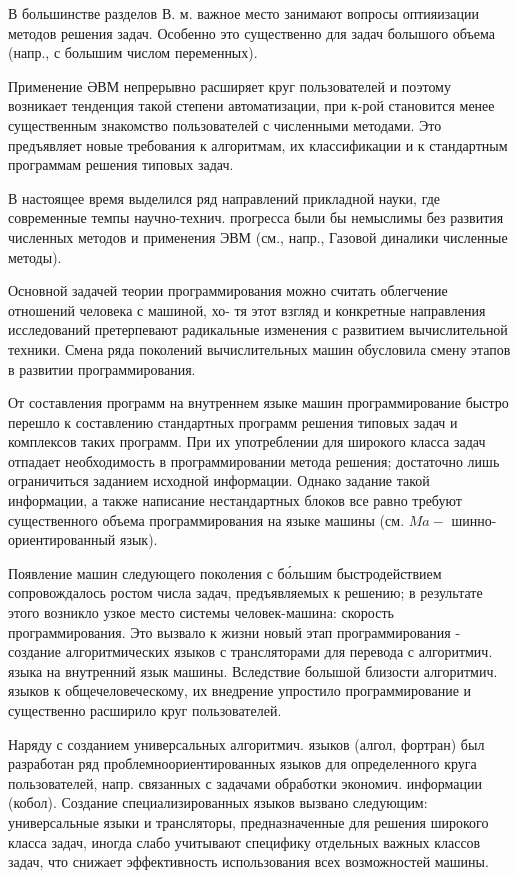 \documentclass[10pt]{article}
\begin{document}
В большинстве разделов В. м. важное место занимают вопросы оптияизации методов решения задач. Особенно это существенно для задач болышого объема (напр., с болышим числом переменных).



Применение ӘВМ непрерывно расширяет круг пользователей и поэтому возникает тенденция такой степени автоматизации, при к-рой становится менее существенным знакомство пользователей с численными методами. Это предъявляет новые требования к алгоритмам, их классификации и к стандартным программам решения типовых задач.



В настоящее время выделился ряд направлений прикладной науки, где современные темпы научно-технич. прогресса были бы немыслимы без развития численных методов и применения ЭВМ (см., напр., Газовой диналики численные методы).



Основной задачей теории программирования можно считать облегчение отношений человека с машиной, хо- тя этот взгляд и конкретные направления исследований претерпевают радикальные изменения с развитием вычислительной техники. Смена ряда поколений вычислительных машин обусловила смену этапов в развитии программирования.



От составления программ на внутреннем языке машин программирование быстро перешло к составлению стандартных программ решения типовых задач и комплексов таких программ. При их употреблении для широкого класса задач отпадает необходимость в программировании метода решения; достаточно лишь ограничиться заданием исходной информации. Однако задание такой информации, а также написание нестандартных блоков все равно требуют существенного объема программирования на языке машины (см. $M a-$ шинно-ориентированный язык).



Появление машин следующего поколения с бо́льшим быстродействием сопровождалось ростом числа задач, предъявляемых к решению; в результате этого возникло узкое место системы человек-машина: скорость программирования. Это вызвало к жизни новый этап программирования - создание алгоритмических языков с трансляторами для перевода с алгоритмич. языка на внутренний язык машины. Вследствие болышой близости алгоритмич. языков к общечеловеческому, их внедрение упростило программирование и существенно расширило круг пользователей.



Наряду с созданием универсальных алгоритмич. языков (алгол, фортран) был разработан ряд проблемноориентированных языков для определенного круга пользователей, напр. связанных с задачами обработки экономич. информации (кобол). Создание специализированных языков вызвано следующим: универсальные языки и трансляторы, предназначенные для решения широкого класса задач, иногда слабо учитывают специфику отдельных важных классов задач, что снижает эффективность использования всех возможностей машины.
\end{document}
